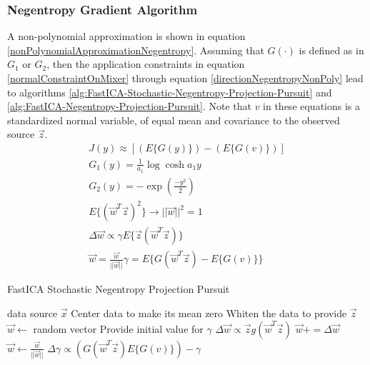\documentclass[11pt]{article}
\begin{document}
\subsubsection{Negentropy Gradient Algorithm}
A non-polynomial approximation is shown in equation \ref{nonPolynomialApproximationNegentropy}.  Assuming that $G(\cdot)$ is defined as in $G_1$ or $G_2$, then %
the application constraints in equation \ref{normalConstraintOnMixer} through equation \ref{directionNegentropyNonPoly} lead to algorithms \ref{alg:FastICA-Stochastic-Negentropy-Projection-Pursuit} and \ref{alg:FastICA-Negentropy-Projection-Pursuit}.  Note that $v$ in these equations is a standardized normal variable, of equal mean and covariance to the observed source $\vec{z}$.
\begin{eqnarray}
	J(y) \approx [(E \{G (y)\}) - (E \{G (v)\}) ] \label{nonPolynomialApproximationNegentropy} \\
G_1 (y) = \frac{1}{a_1} \log \cosh a_1 y \\
G_2 (y) = -\exp (\frac{-y^2}{2}) \\
E\{ (\vec{w}^T \vec{z} )^2 \} \to ||\vec{w}||^2 = 1 \label{normalConstraintOnMixer}\\ 
\Delta \vec{w} \propto \gamma E \{ \vec{z} (\vec{w}^T \vec{z}) \} \\
\vec{w} = \frac{\vec{w}}{||\vec{w}||}
\gamma = E \{G(\vec{w}^T \vec{z}) - E \{ G(v) \} \}  \label{directionNegentropyNonPoly}
\end{eqnarray}
% 

\begin{algorithm}
\caption{FastICA Stochastic Negentropy Projection Pursuit}
\label{alg:FastICA-Stochastic-Negentropy-Projection-Pursuit}
\begin{algorithmic}
	\REQUIRE data source $\vec{x}$
	\STATE Center data to make its mean zero
	\STATE Whiten the data to provide $\vec{z}$
	\STATE $\vec{w} \leftarrow$ random vector
	\STATE Provide initial value for $\gamma$
	\REPEAT
		\STATE $\Delta \vec{w} \propto \vec{z}g(\vec{w}^T\vec{z})$
		\STATE $\vec{w} += \Delta \vec{w} $
		\STATE $\vec{w} \leftarrow \frac{\vec{w}}{||\vec{w}||}$
		\STATE $\Delta \gamma \propto (G(\vec{w}^T \vec{z}) E\{G(v)\}) - \gamma$
\end{algorithmic}
\end{algorithm}
\end{document}
